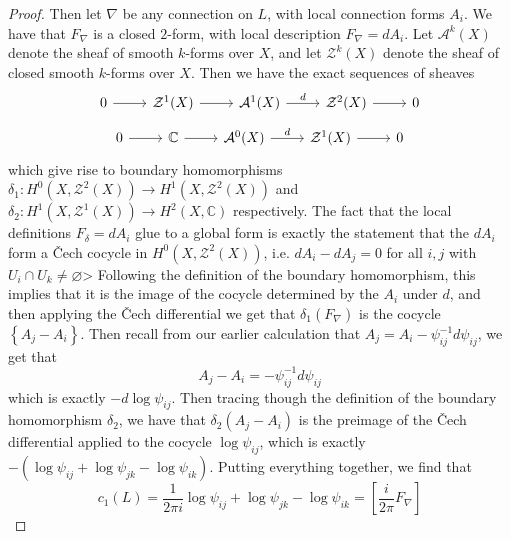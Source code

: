 \documentclass[psamsfonts, 12pt]{amsart}
\theoremstyle{definition}
\theoremstyle{remark}
\renewcommand{\emptyset}{\varnothing}
\newcommand{\C}{\mathbb{C}}
\newcommand{\inv}{^{-1}}
\newcommand{\set}[1]{\left\lbrace #1 \right\rbrace}
\begin{document}
\begin{proof}
Then let $\nabla$ be any connection on $L$, with local connection forms $A_i$.
We have that $F_\nabla$ is a closed $2$-form, with local description $F_\nabla = dA_i$.
Let $\mathcal{A}^k(X)$ denote the sheaf of smooth $k$-forms over $X$, and
let $\mathcal{Z}^k(X)$ denote the sheaf of closed smooth $k$-forms over $X$.
Then we have the exact sequences of sheaves
\[\begin{tikzcd}
0 \ar[r] & \mathcal{Z}^1(X) \ar[r] & \mathcal{A}^1(X) \ar[r, "d"] & \mathcal{Z}^2(X)
\ar[r] & 0
\end{tikzcd}\]
\[\begin{tikzcd}
0 \ar[r] & \C \ar[r] & \mathcal{A}^0(X) \ar[r, "d"] & \mathcal{Z}^1(X) \ar[r] & 0
\end{tikzcd}\]
which give rise to boundary homomorphisms
$\delta_1 : H^0(X, \mathcal{Z}^2(X)) \to H^1(X, \mathcal{Z}^2(X))$ and
$\delta_2 : H^1(X, \mathcal{Z}^1(X)) \to H^2(X, \C)$ respectively. The
fact that the local definitions $F_\delta = dA_i$ glue to a global form
is exactly the statement that the $dA_i$ form a \v{C}ech cocycle in
$H^0(X, \mathcal{Z}^2(X))$, i.e. $dA_i - dA_j = 0$ for all $i,j$ with
$U_i \cap U_k \neq \emptyset$> Following the definition of the boundary homomorphism,
this implies that it is the image of the cocycle determined by the $A_i$ under
$d$, and then applying the \v{C}ech differential we get that
$\delta_1(F_\nabla)$ is the cocycle $\set{A_j - A_i}$. Then recall from our earlier
calculation that $A_j = A_i - \psi_{ij}\inv d\psi_{ij}$, we get that
\[
A_j - A_i = -\psi_{ij}\inv d\psi_{ij}
\]
which is exactly $-d\log\psi_{ij}$. Then tracing though the definition of the
boundary homomorphism $\delta_2$, we have that $\delta_2(A_j - A_i)$
is the preimage of the \v{C}ech differential applied to the cocycle
$\log\psi_{ij}$, which is exactly $-(\log\psi_{ij} + \log\psi_{jk} - \log\psi_{ik})$.
Putting everything together, we find that
\[
c_1(L) = \frac{1}{2\pi i}\log\psi_{ij} + \log\psi_{jk} - \log\psi_{ik}
= \left[ \frac{i}{2\pi}F_\nabla \right]
\]
\end{proof}
%
\end{document}
